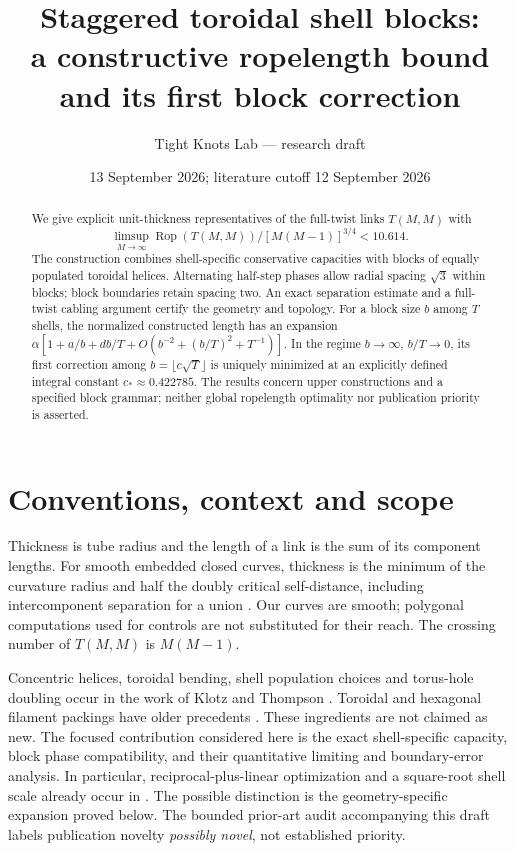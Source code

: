 \documentclass[11pt]{article}
\title{Staggered toroidal shell blocks:\\a constructive ropelength bound and its first block correction}
\author{Tight Knots Lab --- research draft}
\date{13 September 2026; literature cutoff 12 September 2026}
\newcommand{\Rop}{\operatorname{Rop}}
\begin{document}
\maketitle
\begin{abstract}
We give explicit unit-thickness representatives of the full-twist links
$T(M,M)$ with
\[
\limsup_{M\to\infty}\Rop(T(M,M))/[M(M-1)]^{3/4}<10.614.
\]
The construction combines shell-specific conservative capacities with blocks
of equally populated toroidal helices. Alternating half-step phases allow
radial spacing $\sqrt3$ within blocks; block boundaries retain spacing two.
An exact separation estimate and a full-twist cabling argument certify the
geometry and topology. For a block size $b$ among $T$ shells, the normalized
constructed length has an expansion
$\alpha[1+a/b+d b/T+O(b^{-2}+(b/T)^2+T^{-1})]$.
In the regime $b\to\infty$, $b/T\to0$, its first correction among $b=\lfloor c\sqrt T\rfloor$ is uniquely minimized
at an explicitly defined integral constant $c_*\approx0.422785$.
The results concern upper constructions and a specified block grammar;
neither global ropelength optimality nor publication priority is asserted.
\end{abstract}

\section{Conventions, context and scope}
Thickness is tube radius and the length of a link is the sum of its component
lengths. For smooth embedded closed curves, thickness is the minimum of the
curvature radius and half the doubly critical self-distance, including
intercomponent separation for a union \cite{cks}. Our curves are smooth;
polygonal computations used for controls are not substituted for their reach.
The crossing number of $T(M,M)$ is $M(M-1)$.

Concentric helices, toroidal bending, shell population choices and torus-hole
doubling occur in the work of Klotz and Thompson \cite{kt25,klotz26}.
Toroidal and hexagonal filament packings have older precedents
\cite{ob12,star06,atkinson19}. These ingredients are not claimed as new.
The focused contribution considered here is the exact shell-specific
capacity, block phase compatibility, and their quantitative limiting and
boundary-error analysis. In particular, reciprocal-plus-linear optimization
and a square-root shell scale already occur in \cite[Eq.\ (17)--(18)]{kt25}.
The possible distinction is the geometry-specific expansion proved below.
The bounded prior-art audit accompanying this draft labels publication
novelty \emph{possibly novel}, not established priority.
\end{document}
